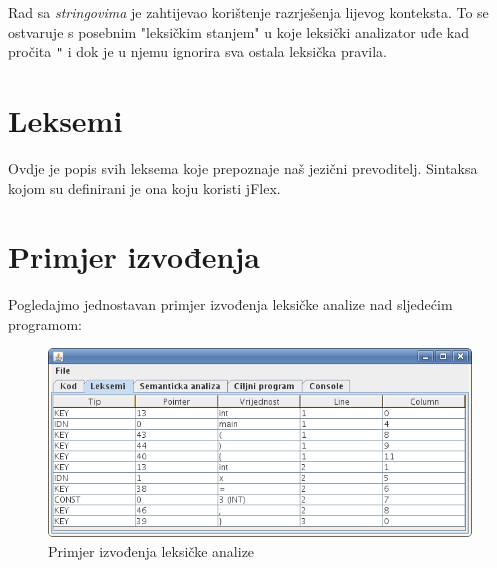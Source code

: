 Rad sa \emph{stringovima} je zahtijevao korištenje razrješenja lijevog konteksta. To se ostvaruje s posebnim "leksičkim stanjem" u
koje leksički analizator uđe kad pročita \texttt{"} i dok je u njemu ignorira sva ostala leksička pravila. 

\section{Leksemi}

Ovdje je popis svih leksema koje prepoznaje naš jezični prevoditelj. Sintaksa kojom su definirani je ona koju koristi jFlex.



\section{Primjer izvođenja}

Pogledajmo jednostavan primjer izvođenja leksičke analize nad sljedećim programom:



\begin{figure}[H]
  \centering
    \includegraphics[width=13cm]{primjer-leksicka1}
  \caption{Primjer izvođenja leksičke analize}
\label{komponente}
\end{figure}
